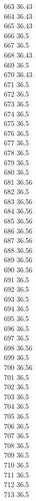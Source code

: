 663	36.43\\
664	36.43\\
665	36.43\\
666	36.5\\
667	36.5\\
668	36.43\\
669	36.5\\
670	36.43\\
671	36.5\\
672	36.5\\
673	36.5\\
674	36.5\\
675	36.5\\
676	36.5\\
677	36.5\\
678	36.5\\
679	36.5\\
680	36.5\\
681	36.56\\
682	36.5\\
683	36.56\\
684	36.56\\
685	36.56\\
686	36.56\\
687	36.56\\
688	36.56\\
689	36.56\\
690	36.56\\
691	36.5\\
692	36.5\\
693	36.5\\
694	36.5\\
695	36.5\\
696	36.5\\
697	36.5\\
698	36.56\\
699	36.5\\
700	36.56\\
701	36.5\\
702	36.5\\
703	36.5\\
704	36.5\\
705	36.5\\
706	36.5\\
707	36.5\\
708	36.5\\
709	36.5\\
710	36.5\\
711	36.5\\
712	36.5\\
713	36.5\\
